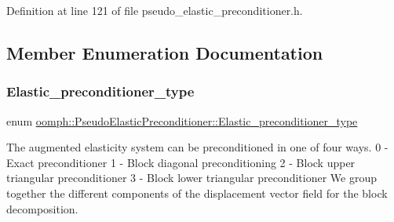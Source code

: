 Definition at line 121 of file pseudo\+\_\+elastic\+\_\+preconditioner.\+h.



\subsection{Member Enumeration Documentation}
\mbox{\label{classoomph_1_1PseudoElasticPreconditioner_acde733e1a111a961d1e714add4e8015d}} 
\subsubsection{\texorpdfstring{Elastic\+\_\+preconditioner\+\_\+type}{Elastic\_preconditioner\_type}}
{\footnotesize\ttfamily enum \hyperlink{classoomph_1_1PseudoElasticPreconditioner_acde733e1a111a961d1e714add4e8015d}{oomph\+::\+Pseudo\+Elastic\+Preconditioner\+::\+Elastic\+\_\+preconditioner\+\_\+type}}



The augmented elasticity system can be preconditioned in one of four ways. 0 -\/ Exact preconditioner 1 -\/ Block diagonal preconditioning 2 -\/ Block upper triangular preconditioner 3 -\/ Block lower triangular preconditioner We group together the different components of the displacement vector field for the block decomposition. 

